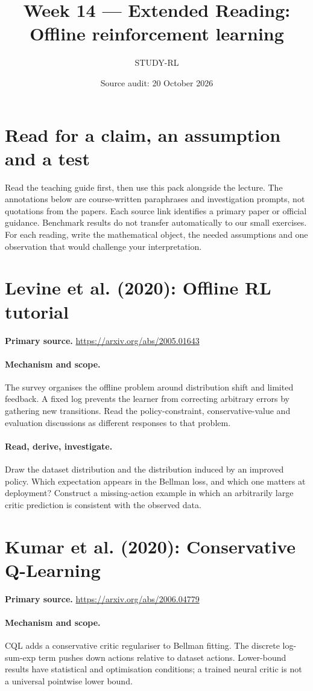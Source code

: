 \documentclass[11pt]{scrartcl}
\title{Week 14 --- Extended Reading: Offline reinforcement learning}
\author{STUDY-RL}
\date{Source audit: 20 October 2026}
\begin{document}
\maketitle
\section*{Read for a claim, an assumption and a test}
Read the teaching guide first, then use this pack alongside the lecture.
The annotations below are course-written paraphrases and investigation prompts,
not quotations from the papers. Each source link identifies a primary paper
or official guidance. Benchmark results do not transfer automatically to our
small exercises. For each reading, write the mathematical object, the needed
assumptions and one observation that would challenge your interpretation.

\section{Levine et al. (2020): Offline RL tutorial}
\noindent\textbf{Primary source.} \url{https://arxiv.org/abs/2005.01643}

\paragraph{Mechanism and scope.} The survey organises the offline problem around distribution shift and limited feedback. A fixed log prevents the learner from correcting arbitrary errors by gathering new transitions. Read the policy-constraint, conservative-value and evaluation discussions as different responses to that problem.

\paragraph{Read, derive, investigate.} Draw the dataset distribution and the distribution induced by an improved policy. Which expectation appears in the Bellman loss, and which one matters at deployment? Construct a missing-action example in which an arbitrarily large critic prediction is consistent with the observed data.

\section{Kumar et al. (2020): Conservative Q-Learning}
\noindent\textbf{Primary source.} \url{https://arxiv.org/abs/2006.04779}

\paragraph{Mechanism and scope.} CQL adds a conservative critic regulariser to Bellman fitting. The discrete log-sum-exp term pushes down actions relative to dataset actions. Lower-bound results have statistical and optimisation conditions; a trained neural critic is not a universal pointwise lower bound.
\end{document}
